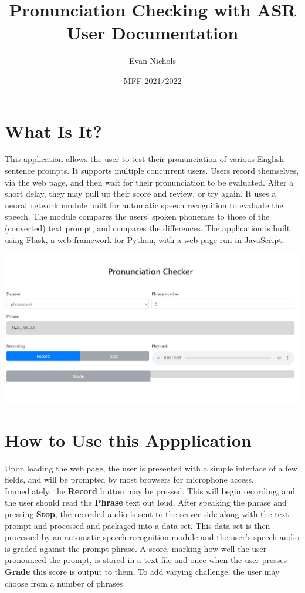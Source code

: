 \documentclass[12pt, letterpaper]{article}
\title{Pronunciation Checking with ASR\\ \small User Documentation}
\author{Evan Nichols}
\date{MFF 2021/2022}
\begin{document}
\maketitle

\section*{What Is It?}
This application allows the user to test their pronunciation of various English sentence prompts. It supports multiple concurrent users. Users record themselves, via the web page, and then wait for their pronunciation to be evaluated. After a short delay, they may pull up their score and review, or try again. It uses a neural network module built for automatic speech recognition to evaluate the speech. The module compares the users' spoken phonemes to those of the (converted) text prompt, and compares the differences. The application is built using Flask, a web framework for Python, with a web page run in JavaScript. 

\begin{center}
    \includegraphics[scale=0.33]{images/homepage.png}
\end{center}

\newpage%
\section*{How to Use this Appplication}
Upon loading the web page, the user is presented with a simple interface of a few fields, and will be prompted by most browsers for microphone access. Immediately, the \textbf{Record} button may be pressed. This will begin recording, and the user should read the \textbf{Phrase} text out loud. After speaking the phrase and pressing \textbf{Stop}, the recorded audio is sent to the server-side along with the text prompt and processed and packaged into a data set. This data set is then processed by an automatic speech recognition module and the user's speech audio is graded against the prompt phrase. A score, marking how well the user pronounced the prompt, is stored in a text file and once when the user presses \textbf{Grade} this score is output to them. To add varying challenge, the user may choose from a number of phrases. 
\end{document}
